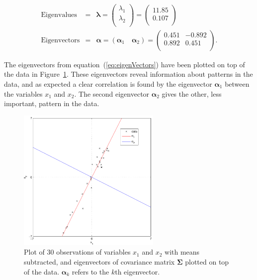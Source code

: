 \begin{eqnarray}\label{eq:eigValues}
\textrm{Eigenvalues} &=& \boldsymbol\lambda = \left(
    \begin{array}{c}
        \lambda_1 \\
        \lambda_2 \\
    \end{array}\right) = \left(
    \begin{array}{c}
        11.85 \\
        0.107 \\
    \end{array}\right)\\\label{eq:eigenVectors}
    \textrm{Eigenvectors} &=& \boldsymbol\alpha = \left( \boldsymbol\alpha_1 \quad \boldsymbol\alpha_2\right) =\left(
    \begin{array}{cc}
         0.451 & -0.892  \\
         0.892 & 0.451   \\
    \end{array}\right).
\end{eqnarray}

The eigenvectors from equation~(\ref{eq:eigenVectors}) have been plotted on top of the data in Figure~\ref{fig:30observationsBarEig}. These eigenvectors reveal information about patterns in the data, and as expected a clear correlation is found by the eigenvector $\boldsymbol\alpha_1$ between the variables $x_1$ and $x_2$. The second eigenvector $\boldsymbol\alpha_2$ gives the other, less important, pattern in the data.

\begin{figure}[!]
  \begin{center}
    \includegraphics[width=260px]{30observationsBarEig.pdf}
    \caption{Plot of 30 observations of variables $x_1$ and $x_2$ with means subtracted, and eigenvectors of covariance matrix $\boldsymbol\Sigma$ plotted on top of the data. $\boldsymbol\alpha_k$ refers to the $k$th eigenvector.}\label{fig:30observationsBarEig}
  \end{center}
\end{figure}

